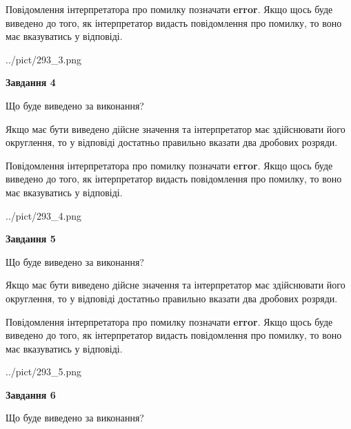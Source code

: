 \documentclass[12pt, ukrainian]{article}
\begin{document}
{\begin {Large}
Повідомлення інтерпретатора про помилку позначати \textbf{error}.
Якщо щось буде виведено до того, як інтерпретатор видасть повідомлення про помилку, 
то воно має вказуватись у відповіді. \par

\begin{center}
	{../pict/293_3.png}
\end{center}
\newpage

{\begin {center}\textbf{Завдання 4}\end {center}}\par
Що буде виведено за виконання? \par

Якщо має бути виведено дійсне значення та інтерпретатор має здійснювати його округлення, 
то у відповіді достатньо правильно вказати два дробових розряди.

Повідомлення інтерпретатора про помилку позначати \textbf{error}.
Якщо щось буде виведено до того, як інтерпретатор видасть повідомлення про помилку, 
то воно має вказуватись у відповіді. \par

\begin{center}
	{../pict/293_4.png}
\end{center}
\newpage

{\begin {center}\textbf{Завдання 5}\end {center}}\par
Що буде виведено за виконання? \par

Якщо має бути виведено дійсне значення та інтерпретатор має здійснювати його округлення, 
то у відповіді достатньо правильно вказати два дробових розряди.

Повідомлення інтерпретатора про помилку позначати \textbf{error}.
Якщо щось буде виведено до того, як інтерпретатор видасть повідомлення про помилку, 
то воно має вказуватись у відповіді. \par

\begin{center}
	{../pict/293_5.png}
\end{center}
\newpage

{\begin {center}\textbf{Завдання 6}\end {center}}\par
Що буде виведено за виконання? \par


\end{Large}}
\end{document}
